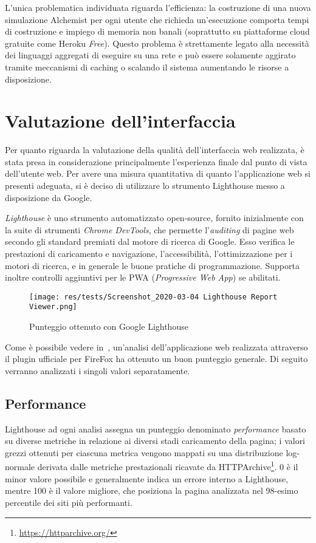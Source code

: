     L'unica problematica individuata riguarda l'efficienza:
    la costruzione di una nuova simulazione Alchemist per ogni utente che richieda un'esecuzione comporta tempi di costruzione e impiego di memoria non banali (soprattutto su piattaforme cloud gratuite come Heroku \emph{Free}).
    Questo problema è strettamente legato alla necessità dei linguaggi aggregati di eseguire su una rete e può essere solamente aggirato tramite meccanismi di caching o scalando il sistema aumentando le risorse a disposizione.

  \section{Valutazione dell'interfaccia}
    Per quanto riguarda la valutazione della qualità dell'interfaccia web realizzata, è stata presa in considerazione principalmente l'esperienza finale dal punto di vista dell'utente web.
    Per avere una misura quantitativa di quanto l'applicazione web si presenti adeguata, si è deciso di utilizzare lo strumento Lighthouse messo a disposizione da Google.

    \emph{Lighthouse} è uno strumento automatizzato open-source, fornito inizialmente con la suite di strumenti \emph{Chrome DevTools}, che permette l'\emph{auditing} di pagine web secondo gli standard premiati dal motore di ricerca di Google.
    Esso verifica le prestazioni di caricamento e navigazione, l'accessibilità, l'ottimizzazione per i motori di ricerca, e in generale le buone pratiche di programmazione.
    Supporta inoltre controlli aggiuntivi per le PWA (\emph{\emph{P}rogressive \emph{W}eb \emph{A}pp}) se abilitati.

    \begin{figure}[htbp]
      \centering
      \texttt{[image: res/tests/Screenshot\_2020-03-04 Lighthouse Report Viewer.png]}%
      \caption{Punteggio ottenuto con Google Lighthouse}%
      \label{fig:lighthouse}
    \end{figure}

    Come è possibile vedere in~, un'analisi dell'applicazione web realizzata attraverso il plugin ufficiale per FireFox ha ottenuto un buon punteggio generale.
    Di seguito verranno analizzati i singoli valori separatamente.

    \subsection{Performance}
      Lighthouse ad ogni analisi assegna un punteggio denominato \emph{performance} basato su diverse metriche in relazione ai diversi stadi caricamento della pagina;
      i valori grezzi ottenuti per ciascuna metrica vengono mappati su una distribuzione log-normale derivata dalle metriche prestazionali ricavate da HTTPArchive\footnote{\url{https://httparchive.org/}}.
      0 è il minor valore possibile e generalmente indica un errore interno a Lighthouse, mentre 100 è il valore migliore, che posiziona la pagina analizzata nel 98-esimo percentile dei siti più performanti.


